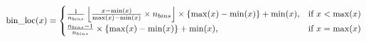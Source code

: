 \documentclass{article}
\begin{document}
\[\arraycolsep=0.0pt\def\arraystretch{1.3}
\text{bin\_loc}(x) = \left\{ \begin{array}{ll}
\frac{1}{n_{bins}} \left\lfloor \frac{x - \min(x)}{\max(x) - \min(x)} \times n_{bins} \right\rfloor \times \{\max(x) - \min(x)\} + \min(x), &\quad \text{if } x < \max(x) \\
\frac{n_{bins} - 1}{n_{bins}} \times \{\max(x) - \min(x) \} + \min(x), & \quad \text{if } x = \max(x)
\end{array}   \right. \]
\end{document}
